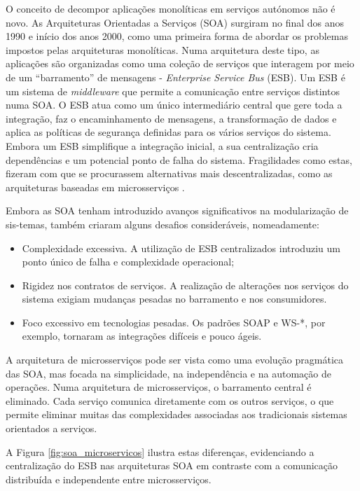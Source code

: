 O conceito de decompor aplicações monolíticas em serviços autónomos não é novo. As Arquiteturas Orientadas a Serviços (SOA) surgiram no final dos anos 1990 e início dos anos 2000, como uma primeira forma de abordar os problemas impostos pelas arquiteturas monolíticas. Numa arquitetura deste tipo, as aplicações são organizadas como uma coleção de serviços que interagem por meio de um “barramento” de mensagens - \textit{Enterprise Service Bus} (ESB). Um ESB é um sistema de \textit{middleware} que permite a comunicação entre serviços distintos numa SOA. O ESB atua como um único intermediário central que gere toda a integração, faz o encaminhamento de mensagens, a transformação de dados e aplica as políticas de segurança definidas para os vários serviços do sistema. Embora um ESB simplifique a integração inicial, a sua centralização cria dependências e um potencial ponto de falha do sistema. Fragilidades como estas, fizeram com que se procurassem alternativas mais descentralizadas, como as arquiteturas baseadas em microsserviços \cite{Aziz2020}.

Embora as SOA tenham introduzido avanços significativos na modularização de sis-temas, também criaram alguns desafios consideráveis, nomeadamente:


\begin{itemize}
    \item Complexidade excessiva. A utilização de ESB centralizados introduziu um ponto único de falha e complexidade operacional;
    \item Rigidez nos contratos de serviços. A realização de alterações nos serviços do sistema exigiam mudanças pesadas no barramento e nos consumidores.
    \item Foco excessivo em tecnologias pesadas. Os padrões SOAP e WS-*, por exemplo, tornaram as integrações difíceis e pouco ágeis.
\end{itemize}

A arquitetura de microsserviços pode ser vista como uma evolução pragmática das SOA, mas focada na simplicidade, na independência e na automação de operações. Numa arquitetura de microsserviços, o barramento central é eliminado. Cada serviço comunica diretamente com os outros serviços, o que permite eliminar muitas das complexidades associadas aos tradicionais sistemas orientados a serviços.

A Figura \ref{fig:soa_microservicos} ilustra estas diferenças, evidenciando a centralização do ESB nas arquiteturas SOA em contraste com a comunicação distribuída e independente entre microsserviços.


